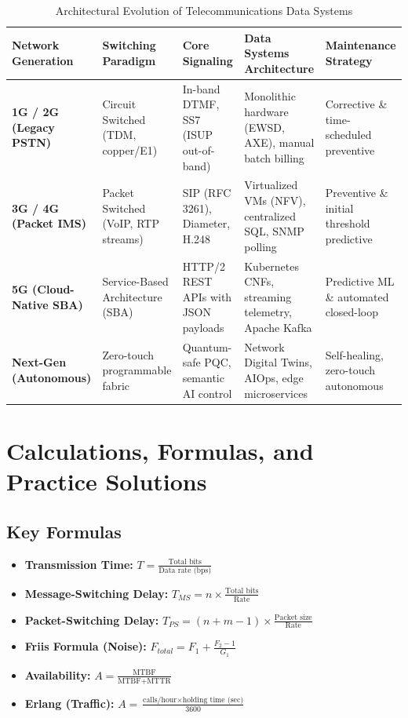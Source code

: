 \documentclass[12pt,a4paper]{report}
\begin{document}
\begin{table}[H]
\centering
\footnotesize
\renewcommand{\arraystretch}{1.3}
\begin{tabularx}{\textwidth}{|>{\raggedright\arraybackslash}p{2.4cm}|>{\raggedright\arraybackslash}p{2.6cm}|>{\raggedright\arraybackslash}p{2.8cm}|>{\raggedright\arraybackslash}p{3.0cm}|>{\raggedright\arraybackslash}X|}
\hline
\textbf{Network Generation} & \textbf{Switching Paradigm} & \textbf{Core Signaling} & \textbf{Data Systems Architecture} & \textbf{Maintenance Strategy} \\ \hline
\textbf{1G / 2G (Legacy PSTN)} & Circuit Switched (TDM, copper/E1) & In-band DTMF, SS7 (ISUP out-of-band) & Monolithic hardware (EWSD, AXE), manual batch billing & Corrective \& time-scheduled preventive \\ \hline
\textbf{3G / 4G (Packet IMS)} & Packet Switched (VoIP, RTP streams) & SIP (RFC 3261), Diameter, H.248 & Virtualized VMs (NFV), centralized SQL, SNMP polling & Preventive \& initial threshold predictive \\ \hline
\textbf{5G (Cloud-Native SBA)} & Service-Based Architecture (SBA) & HTTP/2 REST APIs with JSON payloads & Kubernetes CNFs, streaming telemetry, Apache Kafka & Predictive ML \& automated closed-loop \\ \hline
\textbf{Next-Gen (Autonomous)} & Zero-touch programmable fabric & Quantum-safe PQC, semantic AI control & Network Digital Twins, AIOps, edge microservices & Self-healing, zero-touch autonomous \\ \hline
\end{tabularx}
\caption{Architectural Evolution of Telecommunications Data Systems}
\label{tab:telecom_evolution}
\end{table}

\chapter{Calculations, Formulas, and Practice Solutions}

\section{Key Formulas}
\begin{itemize}
    \item \textbf{Transmission Time:} $T = \frac{\text{Total bits}}{\text{Data rate (bps)}}$
    \item \textbf{Message-Switching Delay:} $T_{MS} = n \times \frac{\text{Total bits}}{\text{Rate}}$
    \item \textbf{Packet-Switching Delay:} $T_{PS} = (n + m - 1) \times \frac{\text{Packet size}}{\text{Rate}}$
    \item \textbf{Friis Formula (Noise):} $F_{total} = F_1 + \frac{F_2 - 1}{G_1}$
    \item \textbf{Availability:} $A = \frac{\text{MTBF}}{\text{MTBF} + \text{MTTR}}$
    \item \textbf{Erlang (Traffic):} $A = \frac{\text{calls/hour} \times \text{holding time (sec)}}{3600}$
\end{itemize}
\end{document}
